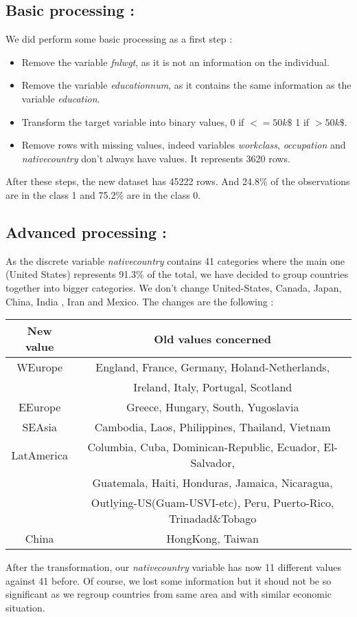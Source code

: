\documentclass[12pt]{article}
\begin{document}
\subsection{Basic processing : }
We did perform some basic processing as a first step : 
\begin{itemize}
\item Remove the variable \emph{fnlwgt}, as it is not an information on the individual.
\item Remove the variable \emph{educationnum}, as it contains the same information as the variable \emph{education}.
\item Transform the target variable into binary values,  0 if $<=50k\$$ 1 if $>50k\$$.
\item Remove rows with missing values, indeed variables \emph{workclass}, \emph{occupation} and \emph{nativecountry} don't always have values. It represents 3620 rows.
\end{itemize}
After these steps, the new dataset has 45222 rows. And 24.8\% of the observations are in the class 1 and 75.2\% are in the class 0.
\subsection{Advanced processing :}
As the discrete variable \emph{nativecountry} contains 41 categories where the main one (United States) represents 91.3\% of the total, we have decided to group countries together into bigger categories. We don't change United-States, Canada, Japan, China, India , Iran and Mexico. The changes are the following :

\begin{center}

\begin{tabular}{|c|c|}
\hline
New value & Old values concerned \\
\hline
WEurope & England, France, Germany, Holand-Netherlands,\\
& Ireland, Italy, Portugal, Scotland\\
\hline
EEurope & Greece, Hungary, South, Yugoslavia\\
\hline
SEAsia & Cambodia, Laos, Philippines, Thailand, Vietnam\\
\hline
 LatAmerica & Columbia, Cuba, Dominican-Republic, Ecuador, El-Salvador, \\
&Guatemala, Haiti, Honduras, Jamaica, Nicaragua, \\
&Outlying-US(Guam-USVI-etc), Peru, Puerto-Rico, Trinadad\&Tobago \\
\hline
China & HongKong, Taiwan \\
\hline
\end{tabular}
\end{center}
After the transformation, our \emph{nativecountry} variable has now 11 different values against 41 before. Of course, we lost some information but it shoud not be so significant as we regroup countries from same area and with similar economic situation.
\end{document}
